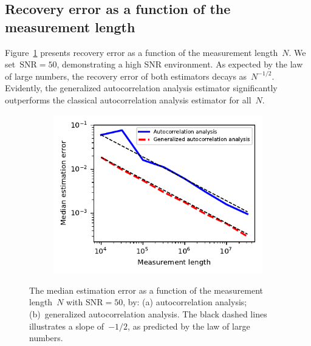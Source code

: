 \documentclass{article}
\newcommand{\rev}[1]{{\color{magenta}{#1}}}
\begin{document}
\subsection{Recovery error as a function of the measurement length}
\label{subsec:exp_size}
Figure~\ref{fig:err_size_experiment} presents recovery error as a function of the measurement length~$N$. We set~\mbox{$\text{SNR} = 50$}, demonstrating a high SNR environment. As expected by the law of large numbers, the recovery error of both estimators decays as~$N^{-1/2}$. Evidently, the generalized autocorrelation analysis estimator significantly outperforms {the} classical autocorrelation analysis estimator for all~$N$.


\begin{figure}[!tb]
	\begin{subfigure}[ht]{\columnwidth}
		\centering
		\includegraphics[width=0.8\columnwidth, keepaspectratio]{figures/experiment_size_err.pdf}
	\end{subfigure}
	\caption{The median estimation error as a function of the measurement length~$N$ with $\text{SNR}=50$, by: (a) autocorrelation analysis; (b)~generalized autocorrelation analysis. {The black dashed lines illustrates a slope of~$-1/2$, as predicted by the law of large numbers.}}
	\label{fig:err_size_experiment}
\end{figure}
\end{document}
